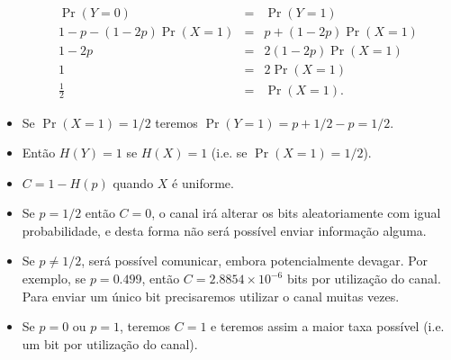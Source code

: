 \begin{frame}[allowframebreaks]
\begin{itemize}
	\begin{eqnarray}
	\Pr(Y=0) &=& \Pr(Y=1) \nonumber \\
	1 - p - (1 - 2p) \Pr(X=1) &=& p + (1 - 2p) \Pr(X=1) \nonumber \\
	1 -2p &=& 2(1-2p) \Pr(X=1) \nonumber \\
	1 &=& 2 \Pr(X=1) \nonumber \\
	\frac{1}{2} &=& \Pr(X=1) .
        \end{eqnarray}
  \item Se $\Pr(X=1) = 1/2$ teremos $\Pr(Y=1) = p + 1/2 -p = 1/2$.
  \item Então $H(Y)=1$ se $H(X)=1$ (i.e. se $\Pr(X=1)=1/2$).
  \item $C = 1 - H(p)$ quando $X$ é uniforme.
  \item Se $p=1/2$ então $C=0$, o canal irá alterar os bits aleatoriamente com igual probabilidade, e desta forma 
	não será possível enviar informação alguma.
  \item Se $p\neq 1/2$, será possível comunicar, embora potencialmente devagar. Por exemplo,
	se $p=0.499$, então $C=2.8854 \times 10^{-6}$ bits por utilização do canal.
	Para enviar um único bit precisaremos utilizar o canal muitas vezes.
  \item Se $p=0$ ou $p=1$, teremos $C=1$ e teremos assim a maior taxa possível 
	(i.e. um bit por utilização do canal).
  \end{itemize}

\end{frame}

